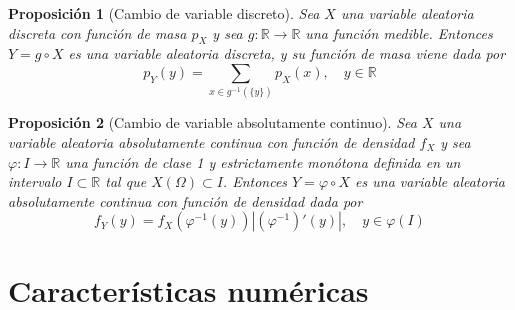 \documentclass[11pt]{report}
\newtheorem{proposition}{Proposición}
\theoremstyle{definition}
\newcommand{\R}{\mathbb R}
\begin{document}
\begin{proposition}[Cambio de variable discreto]
Sea $X$ una variable aleatoria discreta con función de masa $p_X$ y sea $g \colon \R \to \R$ una función medible. Entonces $Y = g \circ X$ es una variable aleatoria discreta, y su función de masa viene dada por
\[p_Y(y) =  \sum_{x \in g^{-1}(\{y\})} p_X(x), \quad y \in \R\]
\end{proposition}

\begin{proposition}[Cambio de variable absolutamente continuo]
\label{propA.16}
Sea $X$ una variable aleatoria absolutamente continua con función de densidad $f_X$ y sea $\varphi \colon I \to \R$ una función de clase 1 y estrictamente monótona definida en un intervalo $I \subset \R$ tal que $X(\Omega) \subset I$. Entonces $Y = \varphi \circ X$ es una variable aleatoria absolutamente continua con función de densidad dada por
\[f_Y(y) = f_X(\varphi^{-1}(y)) |(\varphi^{-1})'(y)|, \quad y \in \varphi(I)\]
\end{proposition}

\section{Características numéricas}
\end{document}

